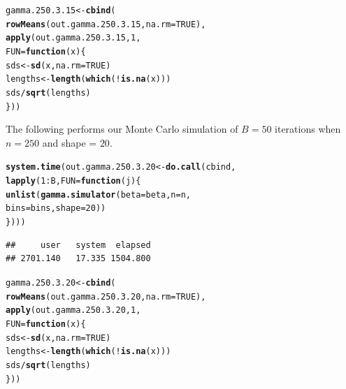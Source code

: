 \documentclass[11pt]{article}\usepackage[]{graphicx}\usepackage[]{color}
\makeatletter
\newcommand{\hlnum}[1]{\textcolor[rgb]{0.686,0.059,0.569}{#1}}%
\newcommand{\hlopt}[1]{\textcolor[rgb]{0,0,0}{#1}}%
\newcommand{\hlstd}[1]{\textcolor[rgb]{0.345,0.345,0.345}{#1}}%
\newcommand{\hlkwa}[1]{\textcolor[rgb]{0.161,0.373,0.58}{\textbf{#1}}}%
\newcommand{\hlkwb}[1]{\textcolor[rgb]{0.69,0.353,0.396}{#1}}%
\newcommand{\hlkwc}[1]{\textcolor[rgb]{0.333,0.667,0.333}{#1}}%
\newcommand{\hlkwd}[1]{\textcolor[rgb]{0.737,0.353,0.396}{\textbf{#1}}}%
\newenvironment{kframe}{%
 \def\at@end@of@kframe{}%
 \ifinner\ifhmode%
  \def\at@end@of@kframe{\end{minipage}}%
  \begin{minipage}{\columnwidth}%
 \fi\fi%
 \def\FrameCommand##1{\hskip\@totalleftmargin \hskip-\fboxsep
 \colorbox{shadecolor}{##1}\hskip-\fboxsep
     \hskip-\linewidth \hskip-\@totalleftmargin \hskip\columnwidth}%
 \MakeFramed {\advance\hsize-\width
   \@totalleftmargin\z@ \linewidth\hsize
   \@setminipage}}%
 {\par\unskip\endMakeFramed%
 \at@end@of@kframe}
\newenvironment{knitrout}{}{} %
\makeatother
\begin{document}
\begin{knitrout}
\color{fgcolor}\begin{kframe}
\begin{alltt}
\hlstd{gamma.250.3.15} \hlkwb{<-} \hlkwd{cbind}\hlstd{(}
  \hlkwd{rowMeans}\hlstd{(out.gamma.250.3.15,} \hlkwc{na.rm} \hlstd{=} \hlnum{TRUE}\hlstd{),}
  \hlkwd{apply}\hlstd{(out.gamma.250.3.15,} \hlnum{1}\hlstd{,}
  \hlkwc{FUN} \hlstd{=} \hlkwa{function}\hlstd{(}\hlkwc{x}\hlstd{)\{}
    \hlstd{sds} \hlkwb{<-} \hlkwd{sd}\hlstd{(x,} \hlkwc{na.rm} \hlstd{=} \hlnum{TRUE}\hlstd{)}
    \hlstd{lengths} \hlkwb{<-} \hlkwd{length}\hlstd{(}\hlkwd{which}\hlstd{(}\hlopt{!}\hlkwd{is.na}\hlstd{(x)))}
    \hlstd{sds} \hlopt{/} \hlkwd{sqrt}\hlstd{(lengths)}
  \hlstd{\}))}
\end{alltt}
\end{kframe}
\end{knitrout}

The following performs our Monte Carlo simulation of $B = 50$ iterations 
when $n = 250$ and shape = $20$.

\begin{knitrout}
\color{fgcolor}\begin{kframe}
\begin{alltt}
\hlkwd{system.time}\hlstd{(out.gamma.250.3.20} \hlkwb{<-} \hlkwd{do.call}\hlstd{(cbind,}
  \hlkwd{lapply}\hlstd{(}\hlnum{1}\hlopt{:}\hlstd{B,} \hlkwc{FUN} \hlstd{=} \hlkwa{function}\hlstd{(}\hlkwc{j}\hlstd{)\{}
    \hlkwd{unlist}\hlstd{(}\hlkwd{gamma.simulator}\hlstd{(}\hlkwc{beta} \hlstd{= beta,} \hlkwc{n} \hlstd{= n,}
      \hlkwc{bins} \hlstd{= bins,} \hlkwc{shape} \hlstd{=} \hlnum{20}\hlstd{))}
\hlstd{\})))}
\end{alltt}
\begin{verbatim}
##     user   system  elapsed 
## 2701.140   17.335 1504.800
\end{verbatim}
\end{kframe}
\end{knitrout}

\begin{knitrout}
\color{fgcolor}\begin{kframe}
\begin{alltt}
\hlstd{gamma.250.3.20} \hlkwb{<-} \hlkwd{cbind}\hlstd{(}
  \hlkwd{rowMeans}\hlstd{(out.gamma.250.3.20,} \hlkwc{na.rm} \hlstd{=} \hlnum{TRUE}\hlstd{),}
  \hlkwd{apply}\hlstd{(out.gamma.250.3.20,} \hlnum{1}\hlstd{,}
  \hlkwc{FUN} \hlstd{=} \hlkwa{function}\hlstd{(}\hlkwc{x}\hlstd{)\{}
    \hlstd{sds} \hlkwb{<-} \hlkwd{sd}\hlstd{(x,} \hlkwc{na.rm} \hlstd{=} \hlnum{TRUE}\hlstd{)}
    \hlstd{lengths} \hlkwb{<-} \hlkwd{length}\hlstd{(}\hlkwd{which}\hlstd{(}\hlopt{!}\hlkwd{is.na}\hlstd{(x)))}
    \hlstd{sds} \hlopt{/} \hlkwd{sqrt}\hlstd{(lengths)}
  \hlstd{\}))}
\end{alltt}
\end{kframe}
\end{knitrout}
\end{document}
